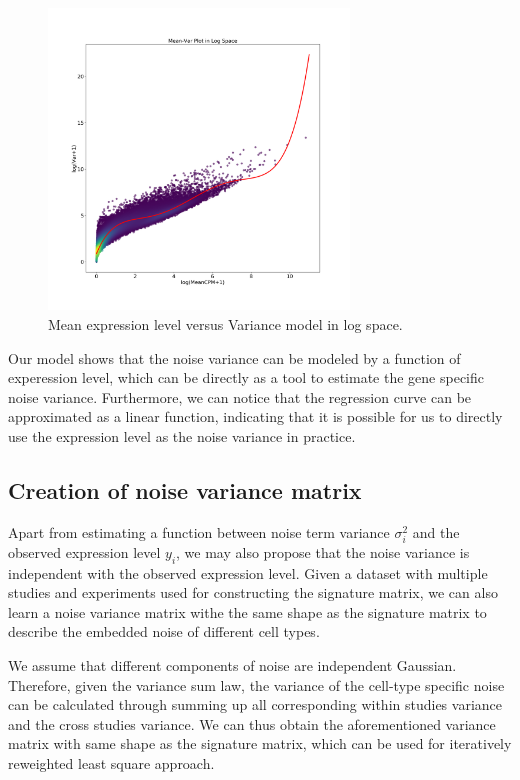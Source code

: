 \documentclass[10pt, a4paper, oneside]{article}
\begin{document}
\begin{figure}
    \centering
    \includegraphics[width=8cm]{Var_Mean_model}
    \caption{Mean expression level versus Variance model in log space.}
    \label{fig1}
\end{figure}

Our model shows that the noise variance can be modeled by a function of experession level, which
can be directly as a tool to estimate the gene specific noise variance. Furthermore, we can notice that
the regression curve can be approximated as a linear function, indicating that it is possible for us
to directly use the expression level as the noise variance in practice.

\subsection{Creation of noise variance matrix}
\justify
Apart from estimating a function between noise term variance $\sigma_i^2$ and the observed expression level $y_i$, we may also propose that
the noise variance is independent with the observed expression level. Given a dataset with multiple studies and experiments used for constructing
the signature matrix, we can also learn a noise variance matrix withe the same shape as the signature matrix to describe the embedded noise of different
cell types.

We assume that different components of noise are independent Gaussian. Therefore, given the variance sum law, the variance of the cell-type specific noise can be calculated
through summing up all corresponding within studies variance and the cross studies variance. We can thus obtain the aforementioned variance matrix with same shape as
the signature matrix, which can be used for iteratively reweighted least square approach.
\end{document}
